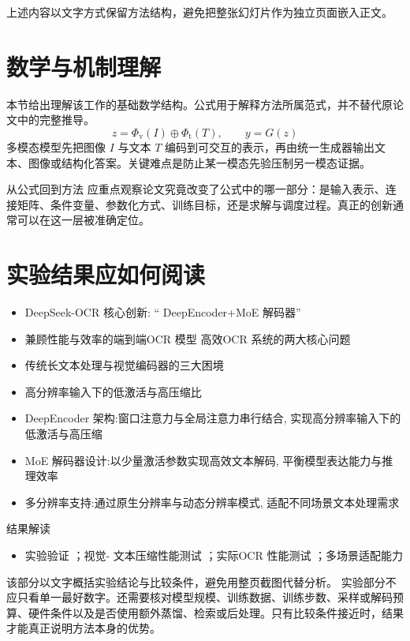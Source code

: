 \documentclass[UTF8,11pt,a4paper]{ctexart}
\begin{document}
上述内容以文字方式保留方法结构，避免把整张幻灯片作为独立页面嵌入正文。

\section{数学与机制理解}
本节给出理解该工作的基础数学结构。公式用于解释方法所属范式，并不替代原论文中的完整推导。
\begin{equation}
z=\Phi_{\mathrm v}(I)\oplus\Phi_{\mathrm t}(T),\qquad y=G(z)
\end{equation}
多模态模型先把图像 $I$ 与文本 $T$ 编码到可交互的表示，再由统一生成器输出文本、图像或结构化答案。关键难点是防止某一模态先验压制另一模态证据。

\begin{keybox}{从公式回到方法}
应重点观察论文究竟改变了公式中的哪一部分：是输入表示、连接矩阵、条件变量、参数化方式、训练目标，还是求解与调度过程。真正的创新通常可以在这一层被准确定位。
\end{keybox}


\section{实验结果应如何阅读}
\begin{itemize}
\item DeepSeek-OCR 核心创新: “ DeepEncoder+MoE 解码器”
\item 兼顾性能与效率的端到端OCR 模型 高效OCR 系统的两大核心问题
\item 传统长文本处理与视觉编码器的三大困境
\item 高分辨率输入下的低激活与高压缩比
\item DeepEncoder 架构:窗口注意力与全局注意力串行结合, 实现高分辨率输入下的低激活与高压缩
\item MoE 解码器设计:以少量激活参数实现高效文本解码, 平衡模型表达能力与推理效率
\item 多分辨率支持:通过原生分辨率与动态分辨率模式, 适配不同场景文本处理需求
\end{itemize}

\begin{notebox}{结果解读}
\begin{itemize}
\item 实验验证 ；视觉- 文本压缩性能测试 ；实际OCR 性能测试 ；多场景适配能力
\end{itemize}
\end{notebox}

该部分以文字概括实验结论与比较条件，避免用整页截图代替分析。
实验部分不应只看单一最好数字。还需要核对模型规模、训练数据、训练步数、采样或解码预算、硬件条件以及是否使用额外蒸馏、检索或后处理。只有比较条件接近时，结果才能真正说明方法本身的优势。
\end{document}
